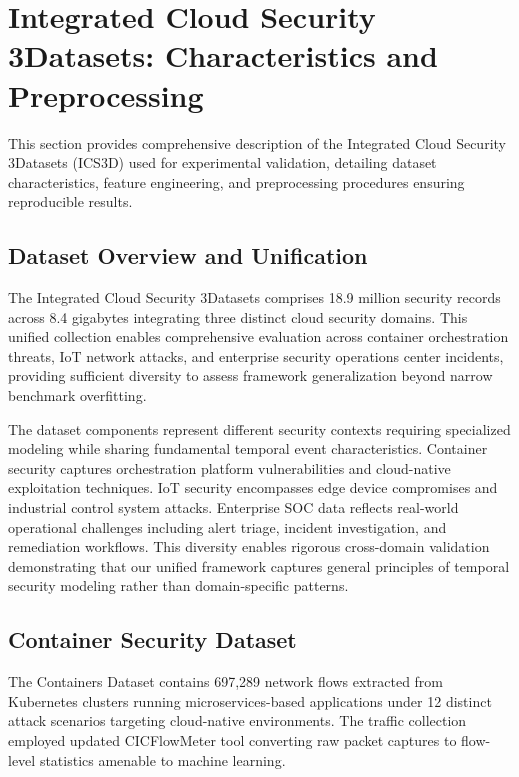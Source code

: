\documentclass[10pt,journal,compsoc]{IEEEtran}
\begin{document}
\section{Integrated Cloud Security 3Datasets: Characteristics and Preprocessing}
\label{sec:datasets}

This section provides comprehensive description of the Integrated Cloud Security 3Datasets (ICS3D) used for experimental validation, detailing dataset characteristics, feature engineering, and preprocessing procedures ensuring reproducible results.

\subsection{Dataset Overview and Unification}

The Integrated Cloud Security 3Datasets comprises 18.9 million security records across 8.4 gigabytes integrating three distinct cloud security domains. This unified collection enables comprehensive evaluation across container orchestration threats, IoT network attacks, and enterprise security operations center incidents, providing sufficient diversity to assess framework generalization beyond narrow benchmark overfitting.

The dataset components represent different security contexts requiring specialized modeling while sharing fundamental temporal event characteristics. Container security captures orchestration platform vulnerabilities and cloud-native exploitation techniques. IoT security encompasses edge device compromises and industrial control system attacks. Enterprise SOC data reflects real-world operational challenges including alert triage, incident investigation, and remediation workflows. This diversity enables rigorous cross-domain validation demonstrating that our unified framework captures general principles of temporal security modeling rather than domain-specific patterns.

\subsection{Container Security Dataset}

The Containers Dataset contains 697,289 network flows extracted from Kubernetes clusters running microservices-based applications under 12 distinct attack scenarios targeting cloud-native environments. The traffic collection employed updated CICFlowMeter tool converting raw packet captures to flow-level statistics amenable to machine learning.
\end{document}
